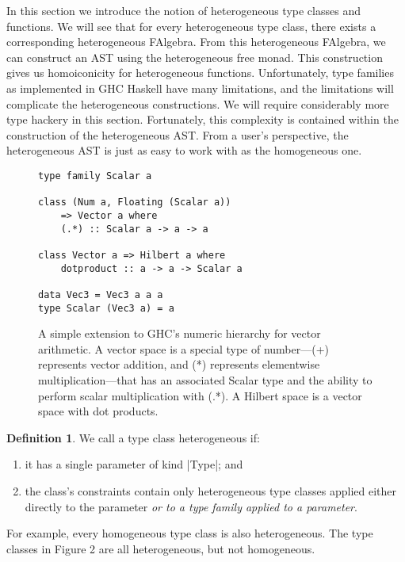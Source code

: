 \documentclass[preprint]{sigplanconf}
\theoremstyle{definition}
\newtheorem{defn}{Definition}
\begin{document}
In this section we introduce the notion of heterogeneous type classes and functions.
We will see that for every heterogeneous type class,
there exists a corresponding heterogeneous FAlgebra.
From this heterogeneous FAlgebra,
we can construct an AST using the heterogeneous free monad.
This construction gives us homoiconicity for heterogeneous functions.
Unfortunately, type families as implemented in GHC Haskell have many limitations,
and the limitations will complicate the heterogeneous constructions.
We will require considerably more type hackery in this section.
Fortunately, this complexity is contained within the construction of the heterogeneous AST.
From a user's perspective, the heterogeneous AST is just as easy to work with as the homogeneous one.

\begin{figure}
\begin{lstlisting}
type family Scalar a

class (Num a, Floating (Scalar a))
    => Vector a where
    (.*) :: Scalar a -> a -> a

class Vector a => Hilbert a where
    dotproduct :: a -> a -> Scalar a

data Vec3 = Vec3 a a a
type Scalar (Vec3 a) = a
\end{lstlisting}
\caption{
    A simple extension to GHC's numeric hierarchy for vector arithmetic.
    A vector space is a special type of number---{\ttfamily (+)} represents vector addition, and {\ttfamily (*)} represents elementwise multiplication---that has an associated {\ttfamily Scalar} type and the ability to perform scalar multiplication with {\ttfamily (.*)}.
    A Hilbert space is a vector space with dot products.
}
\label{code:vector}
\end{figure}


\begin{defn}
We call a type class heterogeneous if:
\begin{enumerate}
\item
it has a single parameter of kind |Type|; and
\item
the class's constraints contain only heterogeneous type classes applied either directly to the parameter \emph{or to a type family applied to a parameter}.
\end{enumerate}
For example, every homogeneous type class is also heterogeneous.
The type classes in Figure 2 are all heterogeneous, but not homogeneous.
\end{defn}
\end{document}

